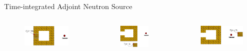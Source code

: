 \documentclass{beamer}
\begin{document}
\begin{frame}{Time-integrated Adjoint Neutron Source}
	\begin{columns}
		\begin{column}{0.3\textwidth}
        \begin{figure}
	\centering
		\vspace{-0.4cm}
	\includegraphics[scale=0.20]{mesh-0.jpg}
	\end{figure}
\end{column}
\vrule{}
		\begin{column}{0.3\textwidth}
		\vspace{0.6cm}
        \begin{figure}
	\centering
	\includegraphics[scale=0.20]{mesh-3.jpg}
	\end{figure}
\end{column}
\vrule{}
		\begin{column}{0.3\textwidth}
		\vspace{-0.4cm}
        \begin{figure}
	\centering
	\includegraphics[scale=0.20]{mesh-5.jpg}
	\end{figure}
\end{column}
	\end{columns}
\end{frame}
\end{document}
